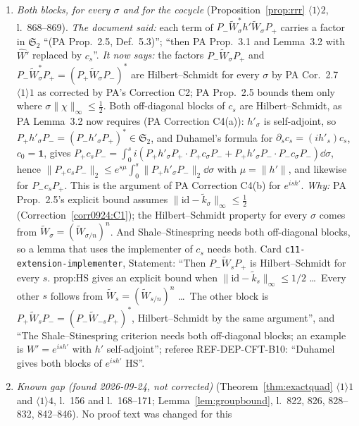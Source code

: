 \documentclass[11pt]{article}
\newcommand{\Wt}{\widetilde W}
\newcommand{\kt}{\widetilde k}
\newcommand{\Stwo}{\mathfrak S_2}
\newcommand{\Pp}{P_+}\newcommand{\Pm}{P_-}
\newcommand{\one}{\mathbf 1}
\newcommand{\norm}[1]{\lVert#1\rVert}
\newcommand{\abs}[1]{\lvert#1\rvert}
\begin{document}
\begin{enumerate}[label=(C\arabic*),ref=C\arabic*,leftmargin=3em]
 its step $\langle1\rangle5$ and PA Prop.~2.5 in its range.  Hence $\norm{G_s}_2\le C_0\abs s$ for
 every $s$, and no restriction on $\zeta$ beyond $\zeta\le\zeta_0$ is needed.
\item\label{corr0924:C2} \emph{Both blocks, for every $\sigma$ and for the cocycle}
 (Proposition~\ref{prop:rrr} $\langle1\rangle2$, l.~868--869).
 \emph{The document said:} each term of $\Pm\Wt_\sigma^*h'\Wt_\sigma\Pp$ carries a factor in
 $\Stwo$ ``(PA Prop.~2.5, Def.~5.3)''; ``then PA Prop.~3.1 and Lemma~3.2 with $\widehat W'$ replaced
 by $c_s$''.
 \emph{It now says:} the factors $\Pm\Wt_\sigma\Pp$ and $\Pm\Wt_\sigma^*\Pp=(\Pp\Wt_\sigma\Pm)^*$
 are Hilbert--Schmidt for every $\sigma$ by PA Cor.~2.7 $\langle1\rangle1$ as corrected by PA's
 Correction C2; PA Prop.~2.5 bounds them only where $\sigma\norm\chi_\infty\le\frac12$.  Both
 off-diagonal blocks of $c_s$ are Hilbert--Schmidt, as PA Lemma~3.2 now requires (PA
 Correction C4(a)): $h'_\sigma$ is self-adjoint, so $\Pp h'_\sigma\Pm=(\Pm h'_\sigma\Pp)^*\in\Stwo$,
 and Duhamel's formula for $\partial_sc_s=(ih'_s)c_s$, $c_0=\one$, gives
 $\Pp c_s\Pm=\int_0^si(\Pp h'_\sigma\Pp\cdot\Pp c_\sigma\Pm+\Pp h'_\sigma\Pm\cdot\Pm c_\sigma\Pm)
 \dd\sigma$, hence $\norm{\Pp c_s\Pm}_2\le e^{s\mu}\int_0^s\norm{\Pp h'_\sigma\Pm}_2\dd\sigma$ with
 $\mu=\norm{h'}$, and likewise for $\Pm c_s\Pp$.  This is the argument of PA Correction C4(b) for
 $e^{ish'}$.
 \emph{Why:} PA Prop.~2.5's explicit bound assumes $\norm{\mathrm{id}-\kt_\sigma}_\infty\le\frac12$
 (Correction~\ref{corr0924:C1}); the Hilbert--Schmidt property for every $\sigma$ comes from
 $\Wt_\sigma=(\Wt_{\sigma/n})^n$.  And Shale--Stinespring needs both off-diagonal blocks, so a
 lemma that uses the implementer of $c_s$ needs both.  Card \texttt{c11-extension-implementer},
 Statement: ``Then $P_-\tilde W_sP_+$ is Hilbert--Schmidt for every $s$.  prop:HS gives an explicit
 bound when $\norm{\mathrm{id}-\tilde k_s}_\infty\le1/2$ \dots\ Every other $s$ follows from
 $\tilde W_s=(\tilde W_{s/n})^n$ \dots\ The other block is $P_+\tilde W_sP_-=(P_-\tilde
 W_{-s}P_+)^*$, Hilbert--Schmidt by the same argument'', and ``The Shale--Stinespring criterion
 needs both off-diagonal blocks; an example is $W'=e^{ish'}$ with $h'$ self-adjoint''; referee
 REF-DEP-CFT-B10: ``Duhamel gives both blocks of $e^{ish'}$ HS''.
\item\label{corr0924:C3} \emph{Known gap (found 2026-09-24, not corrected)}
 (Theorem~\ref{thm:exactquad} $\langle1\rangle1$ and $\langle1\rangle4$, l.~156 and l.~168--171;
 Lemma~\ref{lem:groupbound}, l.~822, 826, 828--832, 842--846).  No proof text was changed for this

\end{enumerate}
\end{document}
